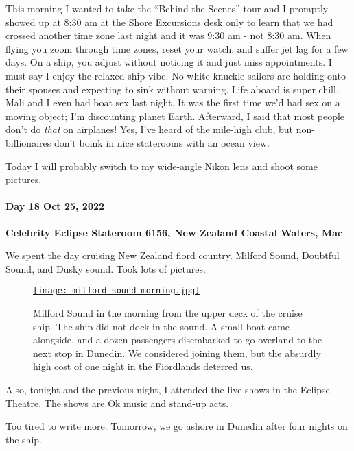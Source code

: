 This morning I wanted to take the ``Behind the Scenes'' tour and I
promptly showed up at 8:30 am at the Shore Excursions desk only to learn
that we had crossed another time zone last night and it was 9:30 am -
not 8:30 am. When flying you zoom through time zones, reset your watch,
and suffer jet lag for a few days. On a ship, you adjust without
noticing it and just miss appointments. I must say I enjoy the relaxed
ship vibe. No white-knuckle sailors are holding onto their spouses and
expecting to sink without warning. Life aboard is super chill. Mali and
I even had boat sex last night. It was the first time we'd had sex on a
moving object; I'm discounting planet Earth. Afterward, I said that most
people don't do \emph{that} on airplanes! Yes, I've heard of the
mile-high club, but non-billionaires don't boink in nice staterooms with
an ocean view.

Today I will probably switch to my wide-angle Nikon lens and shoot some
pictures.

\hypertarget{day-18-oct-25-2022}{%
\paragraph{\texorpdfstring{\textbf{Day 18 Oct 25, 2022}}{Day 18 Oct 25, 2022}}\label{day-18-oct-25-2022}}

\textbf{Celebrity Eclipse Stateroom 6156, New Zealand Coastal Waters, Mac}

We spent the day cruising New Zealand fiord country. Milford Sound,
Doubtful Sound, and Dusky sound. Took lots of pictures.

\captionsetup[figure]{labelformat=empty}
\begin{figure}[htbp]
\centering
\href{https://conceptcontrol.smugmug.com/Trips/Overseas/Australia-New-Zealand-2022/i-8Mw2Rdz/A}{\texttt{[image: milford-sound-morning.jpg]}}
\caption[Milford Sound in the morning]{Milford Sound in the morning from the upper deck of the cruise
ship. The ship did not dock in the sound. A small boat came alongside,
and a dozen passengers disembarked to go overland to the next stop in
Dunedin. We considered joining them, but the absurdly high cost of one
night in the Fiordlands deterred us.}
\label{fig:7606x2}
\end{figure}

Also, tonight and the previous night, I attended the live shows in the
Eclipse Theatre. The shows are Ok music and stand-up acts.

Too tired to write more. Tomorrow, we go ashore in Dunedin after four
nights on the ship.

